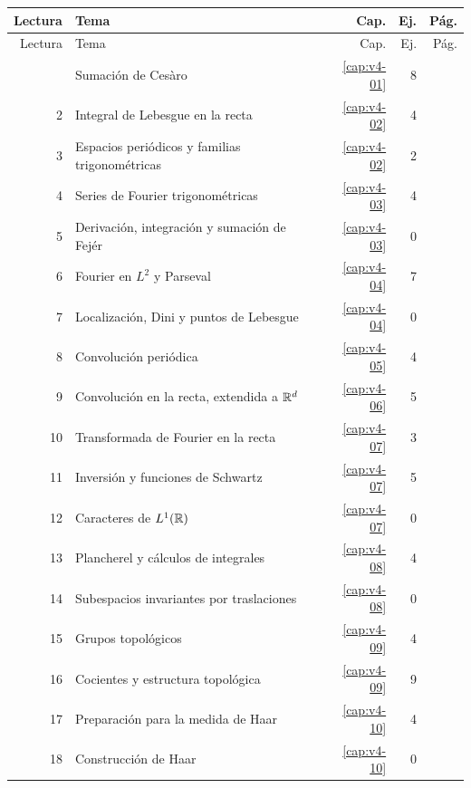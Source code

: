 \footnotesize
\begin{longtable}{@{}r>{\raggedright\arraybackslash}p{}rrr@{}}
\toprule Lectura & Tema & Cap. & Ej. & Pág.\\\midrule
\endfirsthead
\toprule Lectura & Tema & Cap. & Ej. & Pág.\\\midrule
\endhead
\bottomrule\endfoot
1 & Sumación de Cesàro & \ref{cap:v4-01} & 8 & \pageref{lectura:v4-01}\\
2 & Integral de Lebesgue en la recta & \ref{cap:v4-02} & 4 & \pageref{lectura:v4-02}\\
3 & Espacios periódicos y familias trigonométricas & \ref{cap:v4-02} & 2 & \pageref{lectura:v4-03}\\
4 & Series de Fourier trigonométricas & \ref{cap:v4-03} & 4 & \pageref{lectura:v4-04}\\
5 & Derivación, integración y sumación de Fejér & \ref{cap:v4-03} & 0 & \pageref{lectura:v4-05}\\
6 & Fourier en $L^2$ y Parseval & \ref{cap:v4-04} & 7 & \pageref{lectura:v4-06}\\
7 & Localización, Dini y puntos de Lebesgue & \ref{cap:v4-04} & 0 & \pageref{lectura:v4-07}\\
8 & Convolución periódica & \ref{cap:v4-05} & 4 & \pageref{lectura:v4-08}\\
9 & Convolución en la recta, extendida a $\mathbb R^d$ & \ref{cap:v4-06} & 5 & \pageref{lectura:v4-09}\\
10 & Transformada de Fourier en la recta & \ref{cap:v4-07} & 3 & \pageref{lectura:v4-10}\\
11 & Inversión y funciones de Schwartz & \ref{cap:v4-07} & 5 & \pageref{lectura:v4-11}\\
12 & Caracteres de $L^1(\mathbb R)$ & \ref{cap:v4-07} & 0 & \pageref{lectura:v4-12}\\
13 & Plancherel y cálculos de integrales & \ref{cap:v4-08} & 4 & \pageref{lectura:v4-13}\\
14 & Subespacios invariantes por traslaciones & \ref{cap:v4-08} & 0 & \pageref{lectura:v4-14}\\
15 & Grupos topológicos & \ref{cap:v4-09} & 4 & \pageref{lectura:v4-15}\\
16 & Cocientes y estructura topológica & \ref{cap:v4-09} & 9 & \pageref{lectura:v4-16}\\
17 & Preparación para la medida de Haar & \ref{cap:v4-10} & 4 & \pageref{lectura:v4-17}\\
18 & Construcción de Haar & \ref{cap:v4-10} & 0 & \pageref{lectura:v4-18}\\

\end{longtable}
